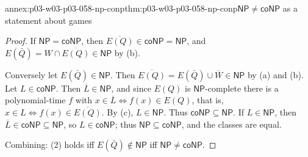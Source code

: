 \begin{annexitem}{annex:p03-w03-p03-058-np-conp}{thm:p03-w03-p03-058-np-conp}{\(\mathsf{NP}\ne\mathsf{coNP}\) as a statement about games}
\begin{proof}
If \(\mathsf{NP}=\mathsf{coNP}\), then \(\overline{E(Q)}\in\mathsf{coNP}=
\mathsf{NP}\), and \(E(\bar Q)=W\cap\overline{E(Q)}\in\mathsf{NP}\) by (b).

Conversely let \(E(\bar Q)\in\mathsf{NP}\). Then
\(\overline{E(Q)}=E(\bar Q)\cup\overline W\in\mathsf{NP}\) by (a) and (b).
Let \(L\in\mathsf{coNP}\). Then \(\overline L\in\mathsf{NP}\), and since
\(E(Q)\) is \(\mathsf{NP}\)-complete there is a polynomial-time \(f\) with
\(x\in\overline L\iff f(x)\in E(Q)\), that is,
\(x\in L\iff f(x)\in\overline{E(Q)}\). By (c), \(L\in\mathsf{NP}\). Thus
\(\mathsf{coNP}\subseteq\mathsf{NP}\). If \(L\in\mathsf{NP}\), then
\(\overline L\in\mathsf{coNP}\subseteq\mathsf{NP}\), so
\(L\in\mathsf{coNP}\); thus \(\mathsf{NP}\subseteq\mathsf{coNP}\), and the
classes are equal.

Combining: (2) holds iff \(E(\bar Q)\notin\mathsf{NP}\) iff
\(\mathsf{NP}\ne\mathsf{coNP}\).
\end{proof}
\end{annexitem}

